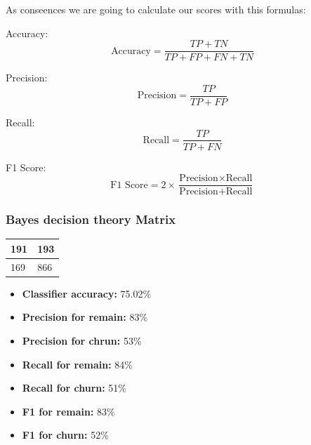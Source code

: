 \documentclass[12pt]{article}
\begin{document}
\newpage
As conseences we are going to calculate our scores with this formulas:\\
\vspace{\baselineskip}

Accuracy:
\[
\text{Accuracy} = \frac{TP + TN}{TP + FP + FN + TN}
\]

Precision:
\[
\text{Precision} = \frac{TP}{TP + FP}
\]

Recall:
\[
\text{Recall} = \frac{TP}{TP + FN}
\]

F1 Score:
\[
\text{F1 Score} = 2 \times \frac{\text{Precision} \times \text{Recall}}{\text{Precision} + \text{Recall}}
\]

\vspace{\baselineskip}

\subsubsection{Bayes decision theory Matrix}
\begin{table}[ht]
  \large
  \centering
\begin{tabular}{|l|l|}
  \hline
  191 & 193\\
  \hline
  169 & 866\\
  \hline
\end{tabular}
\end{table}
\begin{itemize}
  \item \textbf{Classifier accuracy:} 75.02\%
  \item \textbf{Precision for remain:} 83\%
  \item \textbf{Precision for chrun:} 53\%
  \item \textbf{Recall for remain:} 84\%
  \item \textbf{Recall for churn:} 51\%
  \item \textbf{F1 for remain:} 83\%
  \item \textbf{F1 for churn:} 52\%
\end{itemize}

\newpage
\end{document}
